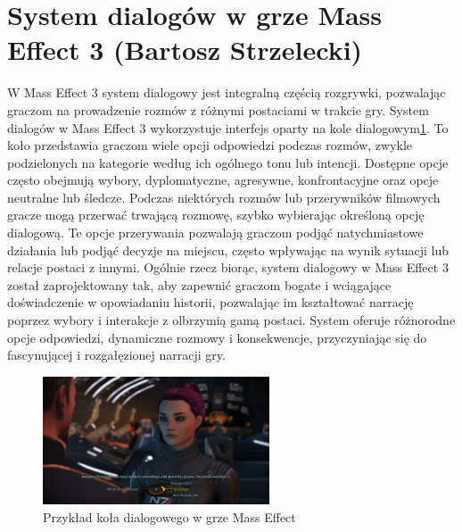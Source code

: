 \section{System dialogów w grze Mass Effect 3 (Bartosz Strzelecki)}
W Mass Effect 3 system dialogowy jest integralną częścią rozgrywki, pozwalając graczom na prowadzenie rozmów z różnymi postaciami w trakcie gry.
System dialogów w Mass Effect 3 wykorzystuje interfejs oparty na kole dialogowym\ref{fig:wheel}.
To koło przedstawia graczom wiele opcji odpowiedzi podczas rozmów, zwykle podzielonych na kategorie według ich ogólnego tonu lub intencji.
Dostępne opcje często obejmują wybory, dyplomatyczne, agresywne, konfrontacyjne oraz opcje neutralne lub śledcze.
Podczas niektórych rozmów lub przerywników filmowych gracze mogą przerwać trwającą rozmowę, szybko wybierając określoną opcję dialogową.
Te opcje przerywania pozwalają graczom podjąć natychmiastowe działania lub podjąć decyzje na miejscu, często wpływając na wynik sytuacji lub relacje postaci z innymi.
Ogólnie rzecz biorąc, system dialogowy w Mass Effect 3 został zaprojektowany tak, aby zapewnić graczom bogate i wciągające doświadczenie w opowiadaniu historii,
pozwalając im kształtować narrację poprzez wybory i interakcje z olbrzymią gamą postaci. System oferuje różnorodne opcje odpowiedzi, dynamiczne rozmowy i konsekwencje,
przyczyniając się do fascynującej i rozgałęzionej narracji gry.

\begin{figure}[h]
\centering
\includegraphics[width=0.6\textwidth]{images/me}
\caption{Przykład koła dialogowego w grze Mass Effect}
\label{fig:wheel}
\end{figure}
